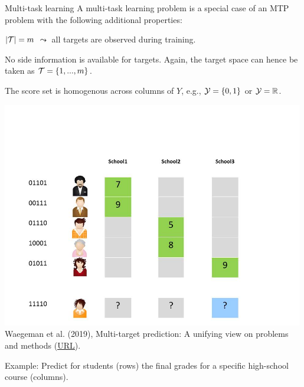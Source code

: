 \begin{frame}{Multi-task learning}
		\small
		A multi-task learning problem is a special case of an MTP problem with the following additional properties: 
%		
		\begin{enumerate}\small
%		
			\item[P5] $|\mathcal{T}|=m$ $\leadsto$ all targets are observed during training. 
%			
			\item[P6] No side information is available for targets. Again, the target space can hence be taken as $\mathcal{T} = \{1,...,m\}$. 
			
			\begin{minipage}{0.45\textwidth}  
%				
				\item[P8d] The score set is homogenous across columns of $Y$, e.g., $\mathcal{Y} = \{0,1\}$ or $\mathcal{Y} = \mathbb{R}$.
%			
			\end{minipage}
			\begin{minipage}{0.45\textwidth}    
				\begin{center}
					\includegraphics[width=0.99\textwidth,trim = 0 0 100 100,clip]{figure/Slide3} \tiny
					\\ Waegeman et al. (2019), Multi-target prediction:
					A unifying view on problems and methods (\href{https://arxiv.org/pdf/1809.02352.pdf}{\underline{URL}}).
				\end{center}
			\end{minipage}
		\end{enumerate}
	Example: Predict for students (rows) the final grades for a specific high-school course (columns).
%	
\end{frame}


